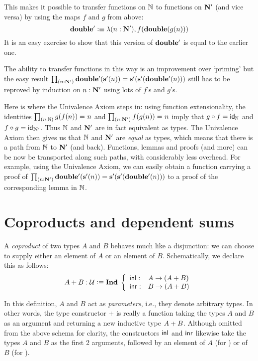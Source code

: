 This makes it possible to transfer functions on $\nat$ to functions on $\natp$ (and vice versa) by using the maps $f$ and $g$ from above:
\[ \dblp \defeq \lambda(n :\natp), f(\dbl(g(n))) \]
It is an easy exercise to show that this version of $\dblp$ is equal to the earlier one.

The ability to transfer functions in this way is an improvement over `priming' but the easy result
$\prd{n : \natp} \dblp(\Sp(n))=\Sp(\Sp(\dblp(n)))$ still has to be reproved
by induction on $n:\natp$ using lots of $f$'s and $g$'s.

Here is where the Univalence Axiom steps in: using function extensionality, the identities $\prd{n : \nat} \id{g(f(n))}{n}$
and $\prd{n : \natp} \id{f(g(n))}{n}$ imply that $g\circ{}f = \idfunc[\nat]$ and $f\circ{}g = \idfunc[\natp]$. Thus
$\nat$ and $\natp$ are in fact equivalent as types.
The Univalence Axiom then gives us that $\nat$ and $\natp$ are
\emph{equal} as types, which means that there is
a path from $\nat$ to $\natp$ (and back). Functions, lemmas and proofs (and more)
can be now be transported along such paths, with considerably less overhead. For example, using the
Univalence Axiom, we can easily obtain a function carrying a proof of
$\prd{n : \natp} \dblp(\Sp(n))=\Sp(\Sp(\dblp(n)))$ to a proof of the corresponding lemma in $\nat$.


\section{Coproducts and dependent sums}
\label{sec:coprod-depsum}

A \emph{coproduct} of two types $A$ and $B$ behaves much like a disjunction: we can choose to supply either an element of $A$ or an element of $B$.
Schematically, we declare this as follows:
\[ \disj{A}{B} : \type \defeq \myInd \left\{
\begin{array}{ll}
\inl : & A \to (\disj{A}{B}) \\
\inr : & B \to (\disj{A}{B})
\end{array}
\right. \]

In this definition, $A$ and $B$ act as \emph{parameters}, i.e., they denote arbitrary types. In other words, the type constructor $+$ is really a function taking the types $A$ and $B$ as an argument and returning a new inductive type $\disj{A}{B}$. Although omitted from the above schema for clarity, the constructors $\inl$ and $\inr$ likewise take the types $A$ and $B$ as the first 2 arguments, followed by an element of $A$ (for \inl) or of $B$ (for \inr).

